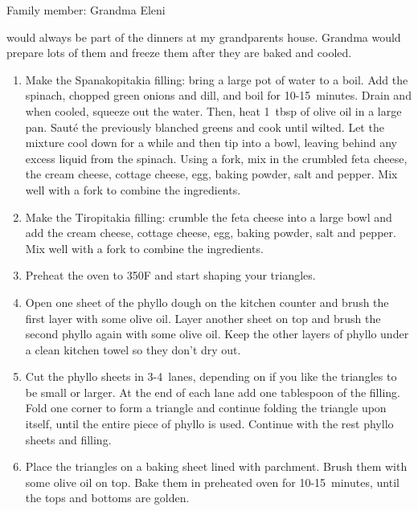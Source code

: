 Family member: Grandma Eleni

 would always be part of the dinners at my grandparents house. Grandma would prepare lots of them and freeze them after they are baked and cooled.

\begin{enumerate}
    \item Make the Spanakopitakia filling: bring a large pot of water to a boil. Add the spinach, chopped green onions and dill, and boil for 10-15~minutes. Drain and when cooled, squeeze out the water. Then, heat 1~tbsp of olive oil in a large pan. Sauté the previously blanched greens and cook until wilted. Let the mixture cool down for a while and then tip into a bowl, leaving behind any excess liquid from the spinach. Using a fork, mix in the crumbled feta cheese, the cream cheese, cottage cheese, egg, baking powder, salt and pepper. Mix well with a fork to combine the ingredients.
    \item Make the Tiropitakia filling: crumble the feta cheese into a large bowl and add the cream cheese, cottage cheese, egg, baking powder, salt and pepper. Mix well with a fork to combine the ingredients.
    \item Preheat the oven to 350\degree F and start shaping your triangles.
    \item Open one sheet of the phyllo dough on the kitchen counter and brush the first layer with some olive oil. Layer another sheet on top and brush the second phyllo again with some olive oil. Keep the other layers of phyllo under a clean kitchen towel so they don't dry out.
    \item Cut the phyllo sheets in 3-4~lanes, depending on if you like the triangles to be small or larger. At the end of each lane add one tablespoon of the filling. Fold one corner to form a triangle and continue folding the triangle upon itself, until the entire piece of phyllo is used. Continue with the rest phyllo sheets and filling.
    \item Place the triangles on a baking sheet lined with parchment. Brush them with some olive oil on top. Bake them in preheated oven for 10-15~minutes, until the tops and bottoms are golden.
\end{enumerate}
